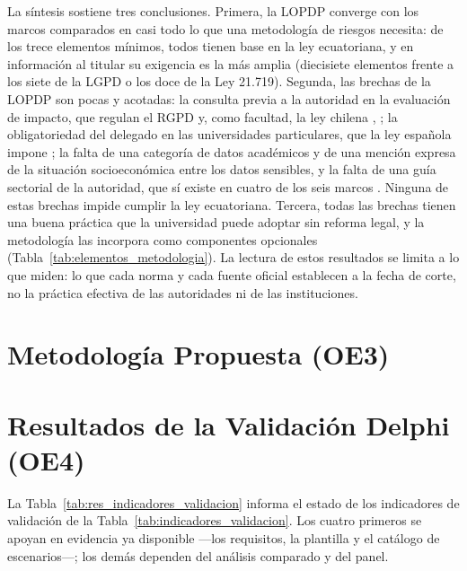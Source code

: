 La síntesis sostiene tres conclusiones. Primera, la LOPDP converge con los marcos comparados en casi todo lo que una metodología de riesgos necesita: de los trece elementos mínimos, todos tienen base en la ley ecuatoriana, y en información al titular su exigencia es la más amplia (diecisiete elementos frente a los siete de la LGPD o los doce de la Ley 21.719). Segunda, las brechas de la LOPDP son pocas y acotadas: la consulta previa a la autoridad en la evaluación de impacto, que regulan el RGPD y, como facultad, la ley chilena \cite[art.~36]{rgpd2016}, \cite[art.~15 ter]{chile2024ley21719}; la obligatoriedad del delegado en las universidades particulares, que la ley española impone \cite[art.~34]{lopdgdd2018}; la falta de una categoría de datos académicos y de una mención expresa de la situación socioeconómica entre los datos sensibles, y la falta de una guía sectorial de la autoridad, que sí existe en cuatro de los seis marcos \cite{aepd2018centros,nces2004privacy,anpd2023academicos,sic2026universitario}. Ninguna de estas brechas impide cumplir la ley ecuatoriana. Tercera, todas las brechas tienen una buena práctica que la universidad puede adoptar sin reforma legal, y la metodología las incorpora como componentes opcionales (Tabla~\ref{tab:elementos_metodologia}). La lectura de estos resultados se limita a lo que miden: lo que cada norma y cada fuente oficial establecen a la fecha de corte, no la práctica efectiva de las autoridades ni de las instituciones.

\section{Metodología Propuesta (OE3)}
\label{sec:metodologia_propuesta}



\section{Resultados de la Validación Delphi (OE4)}
\label{sec:res_delphi}

La Tabla~\ref{tab:res_indicadores_validacion} informa el estado de los indicadores de validación de la Tabla~\ref{tab:indicadores_validacion}. Los cuatro primeros se apoyan en evidencia ya disponible ---los requisitos, la plantilla y el catálogo de escenarios---; los demás dependen del análisis comparado y del panel.

